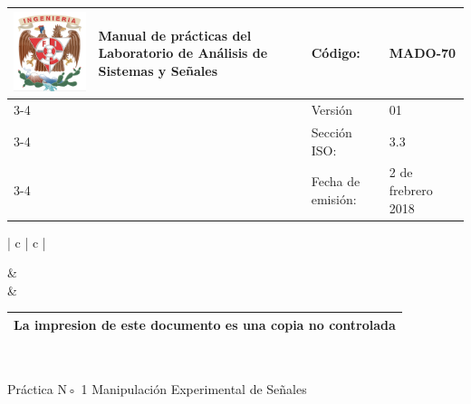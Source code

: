 \documentclass[10pt]{article}
\begin{document}
	\centering
	\begin{tabular}{ |	p{30 mm}|	p{61 mm}	|	p{33mm}	| p{43mm}	| } 
	\hline
	
	
	\multirow{4}{30mm}{\centering \includegraphics[scale=0.22]{logo}} &
	\multirow{4}{61mm}{\centering \textbf{ Manual de prácticas del Laboratorio de Análisis de Sistemas y Señales}}    & Código: & MADO-70 \\
	\cline{3-4}
	& &  Versión & 01 \\
	\cline{3-4}
	& & Sección ISO: & 3.3 \\ \cline{3-4}
	& & Fecha de emisión: & 2 de frebrero 2018 \\
	\hline
	\end{tabular}
\begin{tabular}{ |	c |	c	| } 
	
	 &
	   \\
	& \\ \hline
\end{tabular}
\begin{tabular}{|p{180mm}|}
	\multirow{1}{180mm}{ \centering La impresion de este documento es una copia no controlada }  \\ \hline \end{tabular} \\

\vspace{1cm}

{\Huge Práctica N◦ 1 Manipulación Experimental de Señales}

\hspace{5cm}
\end{document}
